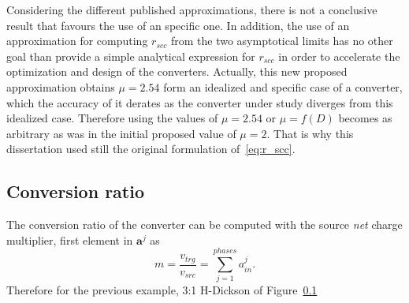 Considering the different published approximations, there is not a conclusive result that favours the use of an specific one. In addition, the use of an approximation for computing $r_{scc}$ from the two asymptotical limits has no other goal than provide a simple analytical expression for $r_{scc}$ in order to accelerate the optimization and design of the converters. Actually, this new proposed approximation obtains $\mu=2.54$ form an idealized and specific case of a converter, which the accuracy of it derates as the converter under study diverges from this idealized case. Therefore using the values of $\mu = 2.54$ or $\mu = f(D) $ becomes as  arbitrary as was in the initial proposed value of $\mu=2$. That is why this dissertation used still the original formulation of~\eqref{eq:r_scc}.


\afterpage{\clearpage}

\subsection{Conversion ratio}

The conversion ratio of the converter can be computed with the source \emph{net} charge multiplier, first element in $\mathbf{a}^j$ as
\begin{equation}
m=\frac{{v_{trg}}}{v_{src}}=\sum_{j=1}^{phases}a_{in}^j.
\label{eq:r_ssl}
\end{equation}
Therefore for the previous example, 3:1 H-Dickson of Figure~\ref{} 


\afterpage{\clearpage}
